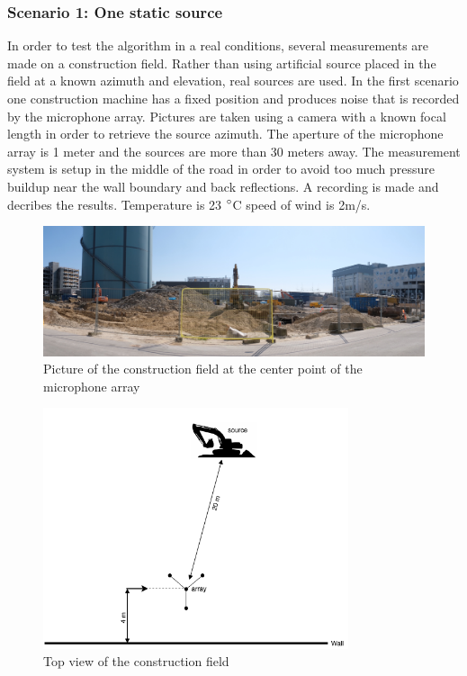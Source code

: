 \subsubsection{Scenario 1: One static source}

In order to test the algorithm in a real conditions, several measurements are made on a construction field. Rather than using artificial source placed in the field at a known azimuth and elevation, real sources are used. In the first scenario one construction machine has a fixed position and produces noise that is recorded by the microphone array. Pictures are taken using a camera with a known focal length in order to retrieve the source azimuth. The aperture of the microphone array is 1 meter and the sources are more than 30 meters away. The measurement system is setup in the middle of the road in order to avoid too much pressure buildup near the wall boundary and back reflections. A recording is made and  decribes the results. Temperature is 23 $\degree$C speed of wind is 2m/s.



 
\begin{figure}[H]
    \centering
    \includegraphics[width=1\textwidth]{Figures/Scenario1pic.jpg}
    \caption{Picture of the construction field at the center point of the microphone array}
    \label{fig:Scenario1pic}
\end{figure}

\begin{figure}[H]
    \centering
    \includegraphics[width=0.8\textwidth]{Figures/scenario2diagram.png}
    \caption{Top view of the construction field}
    \label{fig:Scenario2}
\end{figure}

